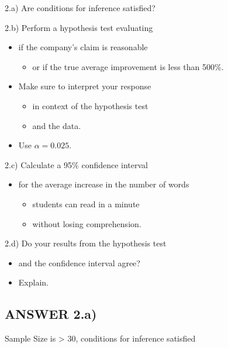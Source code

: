 \documentclass[
]{article}
\providecommand{\tightlist}{%
  \setlength{\itemsep}{0pt}\setlength{\parskip}{0pt}}
\begin{document}
2.a) Are conditions for inference satisfied?

2.b) Perform a hypothesis test evaluating

\begin{itemize}
\tightlist
\item
  if the company's claim is reasonable

  \begin{itemize}
  \tightlist
  \item
    or if the true average improvement is less than 500\%.
  \end{itemize}
\item
  Make sure to interpret your response

  \begin{itemize}
  \tightlist
  \item
    in context of the hypothesis test
  \item
    and the data.
  \end{itemize}
\item
  Use \(\alpha = 0.025\).
\end{itemize}

2.c) Calculate a 95\% confidence interval

\begin{itemize}
\tightlist
\item
  for the average increase in the number of words

  \begin{itemize}
  \tightlist
  \item
    students can read in a minute
  \item
    without losing comprehension.
  \end{itemize}
\end{itemize}

2.d) Do your results from the hypothesis test

\begin{itemize}
\tightlist
\item
  and the confidence interval agree?
\item
  Explain.
\end{itemize}

\hypertarget{answer-2.a}{%
\subsection{ANSWER 2.a)}\label{answer-2.a}}

Sample Size is \textgreater{} 30, conditions for inference satisfied
\end{document}
